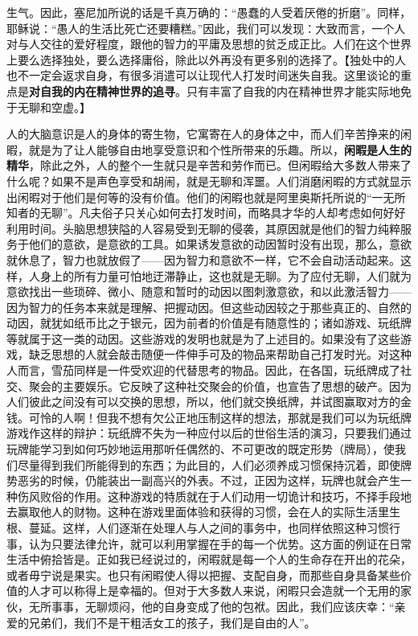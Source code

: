 \documentclass[12pt,oneside]{book}
\begin{document}
生气。因此，塞尼加所说的话是千真万确的：“愚蠢的人受着厌倦的折磨”。同样，耶稣说：“愚人的生活比死亡还要糟糕。”因此，我们可以发现：大致而言，一个人对与人交往的爱好程度，跟他的智力的平庸及思想的贫乏成正比。人们在这个世界上要么选择独处，要么选择庸俗，除此以外再没有更多别的选择了。【独处中的人也不一定会返求自身，有很多消遣可以让现代人打发时间迷失自我。这里谈论的重点是\textbf{对自我的内在精神世界的追寻}。只有丰富了自我的内在精神世界才能实际地免于无聊和空虚。】

人的大脑意识是人的身体的寄生物，它寓寄在人的身体之中，而人们辛苦挣来的闲暇，就是为了让人能够自由地享受意识和个性所带来的乐趣。所以，\textbf{闲暇是人生的精华}，除此之外，人的整个一生就只是辛苦和劳作而已。但闲暇给大多数人带来了什么呢？如果不是声色享受和胡闹，就是无聊和浑噩。人们消磨闲暇的方式就显示出闲暇对于他们是何等的没有价值。他们的闲暇也就是阿里奥斯托所说的“一无所知者的无聊”。凡夫俗子只关心如何去打发时间，而略具才华的人却考虑如何好好利用时间。头脑思想狭隘的人容易受到无聊的侵袭，其原因就是他们的智力纯粹服务于他们的意欲，是意欲的工具。如果诱发意欲的动因暂时没有出现，那么，意欲就休息了，智力也就放假了——因为智力和意欲不一样，它不会自动活动起来。这样，人身上的所有力量可怕地迂滞静止，这也就是无聊。为了应付无聊，人们就为意欲找出一些琐碎、微小、随意和暂时的动因以图刺激意欲，和以此激活智力——因为智力的任务本来就是理解、把握动因。但这些动因较之于那些真正的、自然的动因，就犹如纸币比之于银元，因为前者的价值是有随意性的；诸如游戏、玩纸牌等就属于这一类的动因。这些游戏的发明也就是为了上述目的。如果没有了这些游戏，缺乏思想的人就会敲击随便一件伸手可及的物品来帮助自己打发时光。对这种人而言，雪茄同样是一件受欢迎的代替思考的物品。因此，在各国，玩纸牌成了社交、聚会的主要娱乐。它反映了这种社交聚会的价值，也宣告了思想的破产。因为人们彼此之间没有可以交换的思想，所以，他们就交换纸牌，并试图赢取对方的金钱。可怜的人啊！但我不想有欠公正地压制这样的想法，那就是我们可以为玩纸牌游戏作这样的辩护：玩纸牌不失为一种应付以后的世俗生活的演习，只要我们通过玩牌能学习到如何巧妙地运用那听任偶然的、不可更改的既定形势（牌局），使我们尽量得到我们所能得到的东西；为此目的，人们必须养成习惯保持沉着，即使牌势恶劣的时候，仍能装出一副高兴的外表。不过，正因为这样，玩牌也就会产生一种伤风败俗的作用。这种游戏的特质就在于人们动用一切诡计和技巧，不择手段地去赢取他人的财物。这种在游戏里面体验和获得的习惯，会在人的实际生活里生根、蔓延。这样，人们逐渐在处理人与人之间的事务中，也同样依照这种习惯行事，认为只要法律允许，就可以利用掌握在手的每一个优势。这方面的例证在日常生活中俯拾皆是。正如我已经说过的，闲暇就是每一个人的生命存在开出的花朵，或者毋宁说是果实。也只有闲暇使人得以把握、支配自身，而那些自身具备某些价值的人才可以称得上是幸福的。但对于大多数人来说，闲暇只会造就一个无用的家伙，无所事事，无聊烦闷，他的自身变成了他的包袱。因此，我们应该庆幸：“亲爱的兄弟们，我们不是干粗活女工的孩子，我们是自由的人”。 
\end{document}
